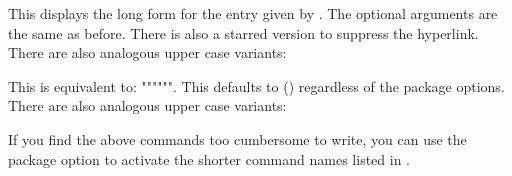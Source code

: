 \documentclass[report]{nlctdoc}
\begin{document}
\begin{definition}[\DescribeMacro{\acrlong}]
\end{definition}
This displays the long form for the entry given by .
The optional arguments are the same as before.  There is also a starred 
version to suppress the hyperlink. There are also analogous upper case 
variants:
\begin{definition}[\DescribeMacro{\Acrlong}]
\end{definition}
\begin{definition}[\DescribeMacro{\ACRlong}]
\end{definition}

\begin{definition}[\DescribeMacro{\acrfull}]
\end{definition}
This is equivalent to: 
\DescribeMacro{\acrfullformat}"{""}{""}".
This defaults to  ()
regardless of the package options. There are also analogous upper
case variants:
\begin{definition}[\DescribeMacro{\Acrfull}]
\end{definition}
\begin{definition}[\DescribeMacro{\ACRfull}]
\end{definition}

If you find the above commands too cumbersome to write, you can use
the  package option to activate the shorter
command names listed in .
\end{document}
